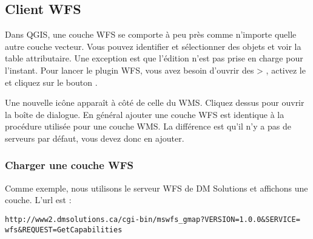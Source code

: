 \subsection{Client WFS}

Dans QGIS, une couche WFS se comporte à peu près comme n'importe quelle autre
couche vecteur. Vous pouvez identifier et sélectionner des objets et
voir la table attributaire. Une exception est que l'édition n'est
pas prise en charge pour l'instant. Pour lancer le plugin WFS, vous avez besoin
d'ouvrir des  >
, activez
le  et cliquez sur le bouton .

Une nouvelle icône 
apparaît à côté de celle du WMS. Cliquez dessus pour ouvrir la boîte de
dialogue. En général ajouter une couche WFS est identique à la procédure
utilisée pour une couche WMS. La différence est qu'il n'y a pas de serveurs par
défaut, vous devez donc en ajouter.

\subsubsection{Charger une couche WFS}

Comme exemple, nous utilisons le serveur WFS de DM Solutions et affichons une
couche. L'url est :
\begin{verbatim}
http://www2.dmsolutions.ca/cgi-bin/mswfs_gmap?VERSION=1.0.0&SERVICE=
wfs&REQUEST=GetCapabilities
\end{verbatim}

